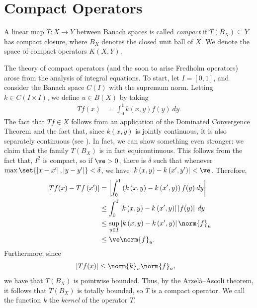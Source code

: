 \documentclass[10pt]{mypackage}
\begin{document}
\RaggedRight
\section{Compact Operators}%
\begin{definition}
  A linear map $T\colon X\rightarrow Y$ between Banach spaces is called \textit{compact} if $ T\left( B_X \right)\subseteq Y $ has compact closure, where $B_X$ denotes the closed unit ball of $X$. We denote the space of compact operators $K(X,Y)$.
\end{definition}
The theory of compact operators (and the soon to arise Fredholm operators) arose from the analysis of integral equations. To start, let $I = [0,1]$, and consider the Banach space $C(I)$ with the supremum norm. Letting $k\in C\left( I\times I \right)$, we define $u\in B(X)$ by taking
\begin{align*}
  Tf(x) &= \int_{0}^{1} k(x,y)f(y)\:dy.
\end{align*}
The fact that $Tf\in X$ follows from an application of the Dominated Convergence Theorem and the fact that, since $k(x,y)$ is jointly continuous, it is also separately continuous (see \cite[Theorem 2.27]{folland_real_analysis}). In fact, we can show something even stronger: we claim that the family $T\left( B_X \right)$ is in fact equicontinuous. This follows from the fact that, $I^2$ is compact, so if $\ve > 0$, there is $\delta$ such that whenever $\max\set{\left\vert x-x' \right\vert,\left\vert y-y' \right\vert} < \delta$, we have $\left\vert k\left( x,y \right) - k\left( x',y' \right) \right\vert < \ve$. Therefore,
\begin{align*}
  \left\vert Tf(x) - Tf\left(x'\right) \right\vert &= \left\vert \int_{0}^{1} \left( k\left( x,y \right) - k\left( x',y \right) \right)f(y)\:dy \right\vert\\
                                                   &\leq \int_{0}^{1} \left\vert k\left( x,y \right) - k\left( x',y \right) \right\vert\left\vert f(y) \right\vert\:dy\\
                                                   &\leq \sup_{y\in I} \left\vert k\left( x,y \right) - k\left( x',y \right) \right\vert \norm{f}_{u}\\
                                                   &\leq \ve \norm{f}_{u}.
\end{align*}
Furthermore, since
\begin{align*}
  \left\vert Tf(x) \right\vert &\leq \norm{k}_{u}\norm{f}_{u},
\end{align*}
we have that $T\left(B_X\right)$ is pointwise bounded. Thus, by the Arzelà--Ascoli theorem, it follows that $T\left( B_X \right)$ is totally bounded, so $T$ is a compact operator. We call the function $k$ the \textit{kernel} of the operator $T$.
\end{document}
